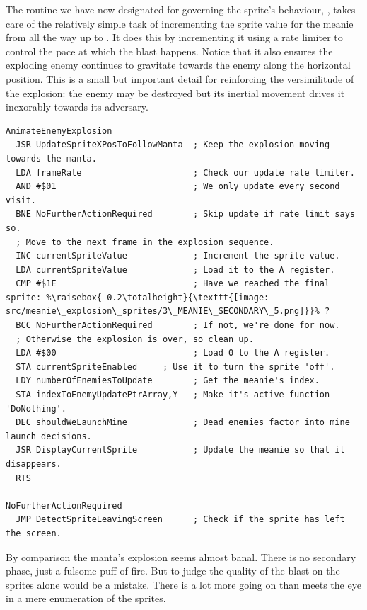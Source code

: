 The routine we have now designated for governing the sprite's behaviour, ,
takes care of the relatively simple task of incrementing the sprite value for the meanie from 
all the way up to . It does this by incrementing it using a rate limiter to control the
pace at which the blast happens. Notice that it also ensures the exploding enemy continues to gravitate
towards the enemy along the horizontal position. This is a small but important detail for reinforcing the
versimilitude of the explosion: the enemy may be destroyed but its inertial movement drives it inexorably
towards its adversary.

\begin{lstlisting}[basicstyle=\scriptsize\ttfamily, escapechar=\%]
AnimateEnemyExplosion
  JSR UpdateSpriteXPosToFollowManta  ; Keep the explosion moving towards the manta.
  LDA frameRate                      ; Check our update rate limiter.
  AND #$01                           ; We only update every second visit.
  BNE NoFurtherActionRequired        ; Skip update if rate limit says so.
  ; Move to the next frame in the explosion sequence.
  INC currentSpriteValue             ; Increment the sprite value.
  LDA currentSpriteValue             ; Load it to the A register.
  CMP #$1E                           ; Have we reached the final sprite: %\raisebox{-0.2\totalheight}{\texttt{[image: src/meanie\_explosion\_sprites/3\_MEANIE\_SECONDARY\_5.png]}}% ?
  BCC NoFurtherActionRequired        ; If not, we're done for now.
  ; Otherwise the explosion is over, so clean up.
  LDA #$00                           ; Load 0 to the A register.
  STA currentSpriteEnabled     ; Use it to turn the sprite 'off'.
  LDY numberOfEnemiesToUpdate        ; Get the meanie's index.
  STA indexToEnemyUpdatePtrArray,Y   ; Make it's active function 'DoNothing'.
  DEC shouldWeLaunchMine             ; Dead enemies factor into mine launch decisions.
  JSR DisplayCurrentSprite           ; Update the meanie so that it disappears.
  RTS

NoFurtherActionRequired
  JMP DetectSpriteLeavingScreen      ; Check if the sprite has left the screen.
\end{lstlisting}

By comparison the manta's explosion seems almost banal. There is no secondary phase, just a fulsome puff of fire.
But to judge the quality of the blast on the sprites alone would be a mistake. There is a lot more going on than
meets the eye in a mere enumeration of the sprites.

